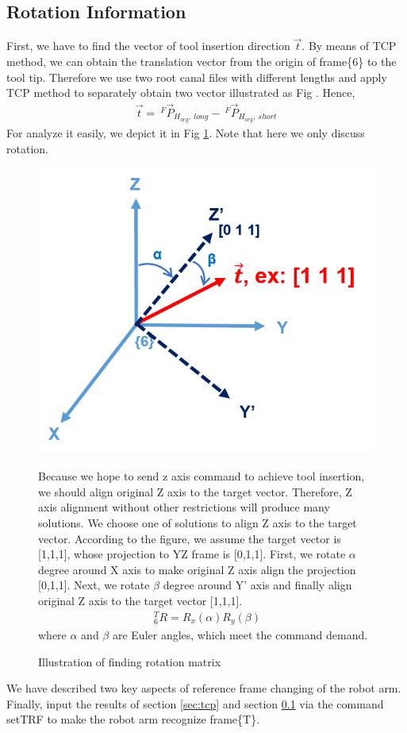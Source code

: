 \subsection{Rotation Information}
\label{sec:rot inf}
First, we have to find the vector of tool insertion direction $\vec{t}$. By means of TCP method, we can obtain the translation vector from the origin of frame\{6\} to the tool tip. Therefore we use two root canal files with different lengths and apply TCP method to separately obtain two vector illustrated as Fig . Hence, 
\begin{equation}
\begin{split}
\vec{t} =\ ^{F}\vec{P}_{H_{org},\ long} -\ ^{F}\vec{P}_{H_{org},\ short}
\end{split}
\end{equation}
For analyze it easily, we depict it in Fig \ref{fig:rot_inf}. Note that here we only discuss rotation.
\begin{figure}[htbp]
\begin{center}
\includegraphics[width=0.6\linewidth]{Images/rot_inf.png}
\end{center}
\caption{
Illustration of finding rotation matrix
}\label{fig:rot_inf}
Because we hope to send z axis command to achieve tool insertion, we should align original Z axis to the target vector. Therefore, Z axis alignment without other restrictions will produce many solutions. We choose one of solutions to align Z axis to the target vector. According to the figure, we assume the target vector is [1,1,1], whose projection to YZ frame is [0,1,1]. First, we rotate $\alpha$ degree around X axis to make original Z axis align the projection [0,1,1]. Next, we rotate $\beta$ degree around Y' axis and finally align original Z axis to the target vector [1,1,1]. 
\begin{equation}
\begin{split}
\ ^T_6R = R_x\left(\alpha \right) R_y\left(\beta \right)  
\end{split}
\end{equation}
where $\alpha$ and $\beta$ are Euler angles, which meet the command demand.
\end{figure} 
We have described two key aspects of reference frame changing of the robot arm. Finally, input the results of section \ref{sec:tcp} and section \ref{sec:rot inf} via the command setTRF to make the robot arm recognize frame\{T\}.